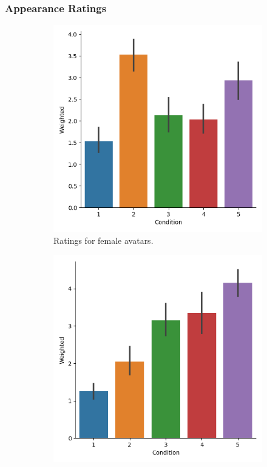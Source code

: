 \subsubsection{Appearance Ratings}
\begin{figure}[H]
 \hspace*{\fill}
     \begin{subfigure}[b]{0.4\textwidth}
         \centering
         \includegraphics[width=\textwidth]{Files/Plots/weighted_ratings_female_experiment.png}
         \caption{Ratings for female avatars.}
         \label{fig:weightedFEx}
     \end{subfigure}
      \hspace*{\fill}
     \begin{subfigure}[b]{0.4\textwidth}
         \centering
         \includegraphics[width=\textwidth]{Files/Plots/weighted_ratings_male_experiment.png}

\end{subfigure}
\end{figure}
